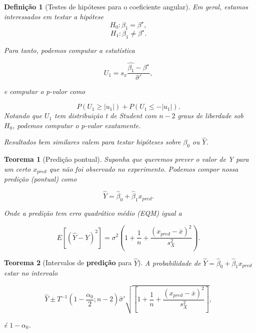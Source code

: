 \documentclass{article}
\newtheorem{theorem}{Teorema}
\newtheorem{definition}{Definição}
\begin{document}
\begin{definition}[Testes de hipóteses para o coeficiente angular]
Em geral, estamos interessados em testar a hipótese
$$H_0 : \beta_1 = \beta^\star,$$
$$H_1 : \beta_1 \neq \beta^\star.$$

Para tanto, podemos computar a estatística

\begin{equation}
 U_1 = s_x \frac{\hat{\beta_1}-\beta^\star}{\hat{\sigma}'},
\end{equation}

e computar o p-valor como 

\begin{equation}
 P(U_1 \geq |u_1|) + P(U_1 \leq -|u_1|).
\end{equation}
Notando que $U_1$ tem distribuição t de Student com $n-2$ graus de liberdade sob $H_0$, podemos computar o p-valor exatamente.

Resultados bem similares valem para testar hipóteses sobre $\beta_0$ ou $\hat{Y}$.
\end{definition}

\begin{theorem}[Predição pontual]
Suponha que queremos prever o valor de Y para um certo $x_{pred}$ que não foi observado no experimento. Podemos compor nossa predição (pontual) como

\begin{equation}
    \hat{Y} = \hat{\beta}_0 + \hat{\beta}_1 x_{pred}.
\end{equation}

Onde a predição tem erro quadrático médio (EQM) igual a

$$E \left [ (\hat{Y} - Y)^2 \right ] = \sigma^2 \left ( 1 + \frac{1}{n} + \frac{(x_{pred} - \overline{x})^2}{s_X^2} \right ).$$
\end{theorem}

\begin{theorem}[Intervalos de \textbf{predição} para $\hat{Y}$]
A probabilidade de $\hat{Y} = \hat{\beta}_0 + \hat{\beta}_1 x_{pred}$ estar no intervalo

$$\hat{Y} \pm T^{-1} (1 - \frac{\alpha_0}{2}; n - 2) \hat{\sigma}' \sqrt{\left [ 1 + \frac{1}{n} + \frac{(x_{pred} - \overline{x})^2}{s_X^2} \right ]},$$

é $1 - \alpha_0$.
\end{theorem}
\end{document}
